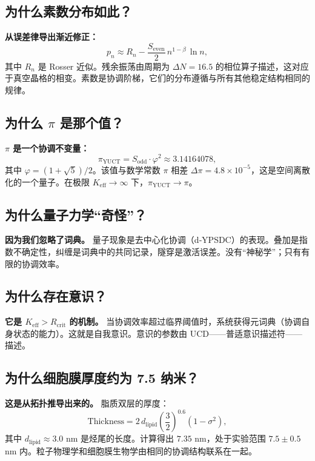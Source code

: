\documentclass[12pt,a4paper]{article}
\newcommand{\Keff}{K_{\mathrm{eff}}}
\newcommand{\betaf}{\beta}
\newcommand{\Sodd}{S_{\mathrm{odd}}}
\newcommand{\Seven}{S_{\mathrm{even}}}
\newcommand{\piYUCT}{\pi_{\mathrm{YUCT}}}
\newcommand{\Rcrit}{R_{\mathrm{crit}}}
\begin{document}
	\subsection{为什么素数分布如此？}
	
	\textbf{从误差律导出渐近修正：}
	\[
	p_n \approx R_n - \frac{\Seven}{2}\, n^{1-\betaf}\,\ln n,
	\]
	其中 \(R_n\) 是 Rosser 近似。残余振荡由周期为 \(\Delta N = 16.5\) 的相位算子描述，这对应于真空晶格的相变。素数是协调阶梯，它们的分布遵循与所有其他稳定结构相同的规律。
	
	\subsection{为什么 \(\pi\) 是那个值？}
	
	\textbf{\(\pi\) 是一个协调不变量：}
	\[
	\piYUCT = \Sodd \cdot \varphi^2 \approx 3.14164078,
	\]
	其中 \(\varphi = (1+\sqrt{5})/2\)。该值与数学常数 \(\pi\) 相差 \(\Delta\pi = 4.8\times10^{-5}\)，这是空间离散化的一个量子。在极限 \(\Keff \to \infty\) 下，\(\piYUCT \to \pi\)。
	
	\subsection{为什么量子力学“奇怪”？}
	
	\textbf{因为我们忽略了词典。} 量子现象是去中心化协调（d‑YPSDC）的表现。叠加是指数不确定性，纠缠是词典中的共同记录，隧穿是激活误差。没有“神秘学”；只有有限的协调效率。
	
	\subsection{为什么存在意识？}
	
	\textbf{它是 \(\Keff > \Rcrit\) 的机制。} 当协调效率超过临界阈值时，系统获得元词典（协调自身状态的能力）。这就是自我意识。意识的参数由 UCD——普适意识描述符——描述。
	
	\subsection{为什么细胞膜厚度约为 7.5 纳米？}
	
	\textbf{这是从拓扑推导出来的。} 脂质双层的厚度：
	\[
	\text{Thickness} = 2 \, d_{\mathrm{lipid}} \left(\frac{3}{2}\right)^{0.6} (1 - \sigma^2),
	\]
	其中 \(d_{\mathrm{lipid}} \approx 3.0\) nm 是烃尾的长度。计算得出 \(7.35\) nm，处于实验范围 \(7.5 \pm 0.5\) nm 内。粒子物理学和细胞膜生物学由相同的协调结构联系在一起。
	
\end{document}
